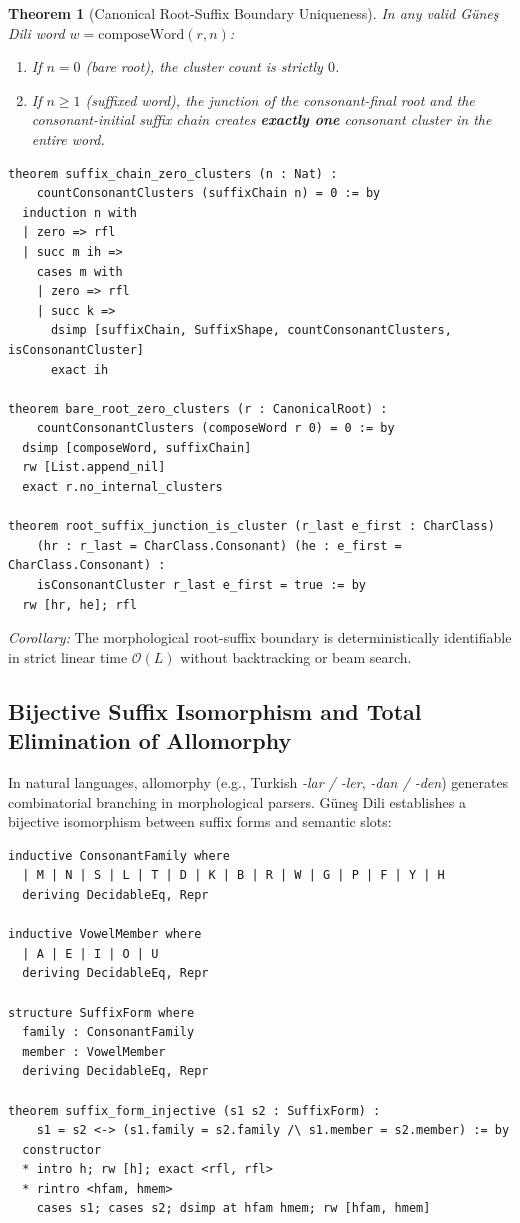 \documentclass[11pt,a4paper]{article}
\newtheorem{theorem}{Theorem}
\begin{document}
\begin{theorem}[Canonical Root-Suffix Boundary Uniqueness]
In any valid Güneş Dili word $w = \text{composeWord}(r, n)$:
\begin{enumerate}
    \item If $n = 0$ (bare root), the cluster count is strictly $0$.
    \item If $n \ge 1$ (suffixed word), the junction of the consonant-final root and the consonant-initial suffix chain creates \textbf{exactly one} consonant cluster in the entire word.
\end{enumerate}
\end{theorem}

\begin{lstlisting}[language=Lean]
theorem suffix_chain_zero_clusters (n : Nat) :
    countConsonantClusters (suffixChain n) = 0 := by
  induction n with
  | zero => rfl
  | succ m ih =>
    cases m with
    | zero => rfl
    | succ k =>
      dsimp [suffixChain, SuffixShape, countConsonantClusters, isConsonantCluster]
      exact ih

theorem bare_root_zero_clusters (r : CanonicalRoot) :
    countConsonantClusters (composeWord r 0) = 0 := by
  dsimp [composeWord, suffixChain]
  rw [List.append_nil]
  exact r.no_internal_clusters

theorem root_suffix_junction_is_cluster (r_last e_first : CharClass)
    (hr : r_last = CharClass.Consonant) (he : e_first = CharClass.Consonant) :
    isConsonantCluster r_last e_first = true := by
  rw [hr, he]; rfl
\end{lstlisting}

\noindent\textit{Corollary:} The morphological root-suffix boundary is deterministically identifiable in strict linear time $\mathcal{O}(L)$ without backtracking or beam search.

\subsection{Bijective Suffix Isomorphism and Total Elimination of Allomorphy}

In natural languages, allomorphy (e.g., Turkish \textit{-lar / -ler}, \textit{-dan / -den}) generates combinatorial branching in morphological parsers. Güneş Dili establishes a bijective isomorphism between suffix forms and semantic slots:
\begin{lstlisting}[language=Lean]
inductive ConsonantFamily where
  | M | N | S | L | T | D | K | B | R | W | G | P | F | Y | H
  deriving DecidableEq, Repr

inductive VowelMember where
  | A | E | I | O | U
  deriving DecidableEq, Repr

structure SuffixForm where
  family : ConsonantFamily
  member : VowelMember
  deriving DecidableEq, Repr

theorem suffix_form_injective (s1 s2 : SuffixForm) :
    s1 = s2 <-> (s1.family = s2.family /\ s1.member = s2.member) := by
  constructor
  * intro h; rw [h]; exact <rfl, rfl>
  * rintro <hfam, hmem>
    cases s1; cases s2; dsimp at hfam hmem; rw [hfam, hmem]
\end{lstlisting}
\end{document}
